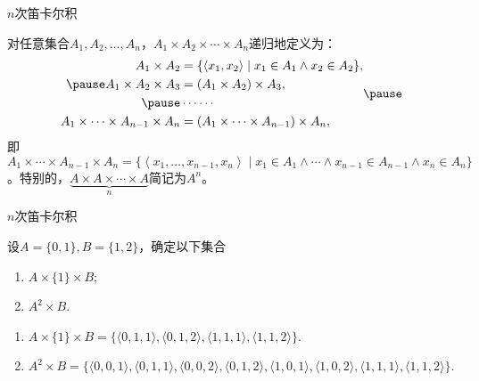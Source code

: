 {\kongbai
\begin{frame}{$n$次笛卡尔积}
\pause
  \begin{defi}
    对任意集合$A_1,A_2,\ldots,A_n$，$A_1\times A_2\times \cdots\times A_n$递归地定义为：\pause
    \begin{equation*}
    \begin{aligned}
      A_1\times A_2&=\{\left\langle x_1,x_2\right\rangle\mid x_1\in A_1\wedge x_2\in A_2\},\\ \pause
      A_1\times A_2\times A_3&=\left(A_1\times A_2\right)\times A_3,\\ \pause
      &\cdots\cdots \\
     A_1\times\cdots\times A_{n-1}\times  A_n&=\left(A_1\times\cdots\times A_{n-1}\right)\times A_n,
    \end{aligned}\pause
  \end{equation*}
  即$A_1\times\cdots\times A_{n-1}\times  A_n=\{\left\langle x_1,\ldots ,x_{n-1},x_n\right\rangle\mid x_1\in A_1\land\cdots\land x_{n-1}\in A_{n-1}\land x_n\in A_n\}$。\pause 特别的，$\underbrace{A\times A\times \cdots\times A}_n$简记为$A^n$。
  \end{defi}
\end{frame}
}

\begin{frame}{$n$次笛卡尔积}
\pause
\begin{exam}
  设$A=\{0,1\},B=\{1,2\}$，确定以下集合
  \vspace{-1.5ex}
  \begin{multicols}{4}
  \begin{enumerate}
    \item $A\times \{1\}\times B$;
    \item $A^2\times B$.
  \end{enumerate}
  \end{multicols}
\end{exam}\pause
\vspace{2ex}
\begin{enumerate}
  \item $A \times\{1\} \times B=\{\langle 0,1,1\rangle,\langle 0,1,2\rangle,\langle 1,1,1\rangle,\langle 1,1,2\rangle\}$.\\[6pt] \pause
  \item $A^{2} \times B=\{\langle0,0,1\rangle,\langle 0,1,1\rangle,\langle 0,0,2\rangle,\langle 0,1,2\rangle,\langle 1,0,1\rangle,\langle 1,0,2\rangle,\langle 1,1,1\rangle,\langle 1,1,2\rangle\}$.
\end{enumerate}

\end{frame}

